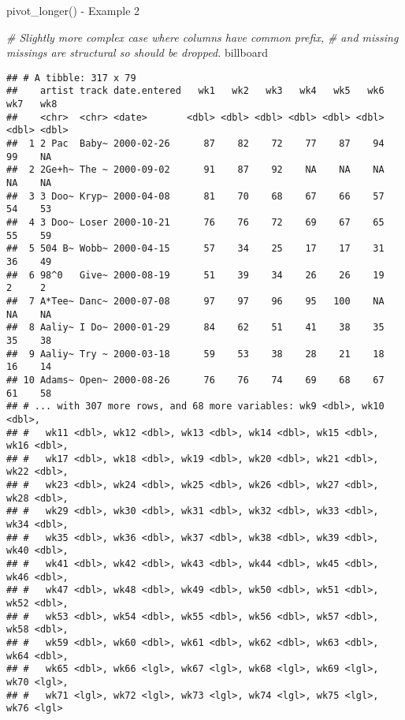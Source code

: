 \documentclass[
  ignorenonframetext,
]{beamer}
\newenvironment{Shaded}{\begin{snugshade}}{\end{snugshade}}
\newcommand{\CommentTok}[1]{\textcolor[rgb]{0.56,0.35,0.01}{\textit{#1}}}
\newcommand{\NormalTok}[1]{#1}
\begin{document}
\begin{frame}[fragile]{pivot\_longer() - Example 2}
\protect\hypertarget{pivot_longer---example-2}{}

\begin{Shaded}
\begin{Highlighting}[]
\CommentTok{# Slightly more complex case where columns have common prefix,}
\CommentTok{# and missing missings are structural so should be dropped.}
\NormalTok{billboard}
\end{Highlighting}
\end{Shaded}

\begin{verbatim}
## # A tibble: 317 x 79
##    artist track date.entered   wk1   wk2   wk3   wk4   wk5   wk6   wk7   wk8
##    <chr>  <chr> <date>       <dbl> <dbl> <dbl> <dbl> <dbl> <dbl> <dbl> <dbl>
##  1 2 Pac  Baby~ 2000-02-26      87    82    72    77    87    94    99    NA
##  2 2Ge+h~ The ~ 2000-09-02      91    87    92    NA    NA    NA    NA    NA
##  3 3 Doo~ Kryp~ 2000-04-08      81    70    68    67    66    57    54    53
##  4 3 Doo~ Loser 2000-10-21      76    76    72    69    67    65    55    59
##  5 504 B~ Wobb~ 2000-04-15      57    34    25    17    17    31    36    49
##  6 98^0   Give~ 2000-08-19      51    39    34    26    26    19     2     2
##  7 A*Tee~ Danc~ 2000-07-08      97    97    96    95   100    NA    NA    NA
##  8 Aaliy~ I Do~ 2000-01-29      84    62    51    41    38    35    35    38
##  9 Aaliy~ Try ~ 2000-03-18      59    53    38    28    21    18    16    14
## 10 Adams~ Open~ 2000-08-26      76    76    74    69    68    67    61    58
## # ... with 307 more rows, and 68 more variables: wk9 <dbl>, wk10 <dbl>,
## #   wk11 <dbl>, wk12 <dbl>, wk13 <dbl>, wk14 <dbl>, wk15 <dbl>, wk16 <dbl>,
## #   wk17 <dbl>, wk18 <dbl>, wk19 <dbl>, wk20 <dbl>, wk21 <dbl>, wk22 <dbl>,
## #   wk23 <dbl>, wk24 <dbl>, wk25 <dbl>, wk26 <dbl>, wk27 <dbl>, wk28 <dbl>,
## #   wk29 <dbl>, wk30 <dbl>, wk31 <dbl>, wk32 <dbl>, wk33 <dbl>, wk34 <dbl>,
## #   wk35 <dbl>, wk36 <dbl>, wk37 <dbl>, wk38 <dbl>, wk39 <dbl>, wk40 <dbl>,
## #   wk41 <dbl>, wk42 <dbl>, wk43 <dbl>, wk44 <dbl>, wk45 <dbl>, wk46 <dbl>,
## #   wk47 <dbl>, wk48 <dbl>, wk49 <dbl>, wk50 <dbl>, wk51 <dbl>, wk52 <dbl>,
## #   wk53 <dbl>, wk54 <dbl>, wk55 <dbl>, wk56 <dbl>, wk57 <dbl>, wk58 <dbl>,
## #   wk59 <dbl>, wk60 <dbl>, wk61 <dbl>, wk62 <dbl>, wk63 <dbl>, wk64 <dbl>,
## #   wk65 <dbl>, wk66 <lgl>, wk67 <lgl>, wk68 <lgl>, wk69 <lgl>, wk70 <lgl>,
## #   wk71 <lgl>, wk72 <lgl>, wk73 <lgl>, wk74 <lgl>, wk75 <lgl>, wk76 <lgl>
\end{verbatim}

\end{frame}
\end{document}

